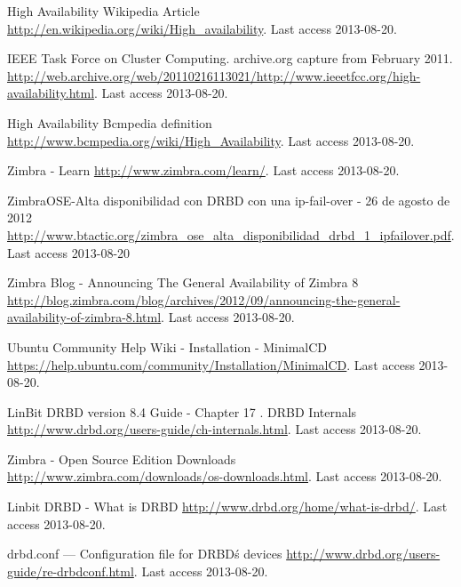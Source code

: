 
\begin{thebibliography}{1}


 High Availability Wikipedia Article
\url{http://en.wikipedia.org/wiki/High_availability}. Last access 2013-08-20.

 IEEE Task Force on Cluster Computing. archive.org capture from February 2011.
\url{http://web.archive.org/web/20110216113021/http://www.ieeetfcc.org/high-availability.html}. Last access 2013-08-20.

 High Availability Bcmpedia definition
\url{http://www.bcmpedia.org/wiki/High_Availability}. Last access 2013-08-20.

 Zimbra - Learn
\url{http://www.zimbra.com/learn/}. Last access 2013-08-20.

 ZimbraOSE-Alta disponibilidad con DRBD con una ip-fail-over - 26 de agosto de 2012
\url{http://www.btactic.org/zimbra_ose_alta_disponibilidad_drbd_1_ipfailover.pdf}. Last access 2013-08-20

 Zimbra Blog - Announcing The General Availability of Zimbra 8
\url{http://blog.zimbra.com/blog/archives/2012/09/announcing-the-general-availability-of-zimbra-8.html}. Last access 2013-08-20.


 Ubuntu Community Help Wiki - Installation - MinimalCD
\url{https://help.ubuntu.com/community/Installation/MinimalCD}. Last access 2013-08-20.

 LinBit DRBD version 8.4 Guide - Chapter 17 . DRBD Internals
\url{http://www.drbd.org/users-guide/ch-internals.html}. Last access 2013-08-20.


 Zimbra - Open Source Edition Downloads
\url{http://www.zimbra.com/downloads/os-downloads.html}. Last access 2013-08-20.


 Linbit DRBD - What is DRBD
\url{http://www.drbd.org/home/what-is-drbd/}. Last access 2013-08-20.

 drbd.conf — Configuration file for DRBD\'s devices
\url{http://www.drbd.org/users-guide/re-drbdconf.html}. Last access 2013-08-20.


\end{thebibliography}
